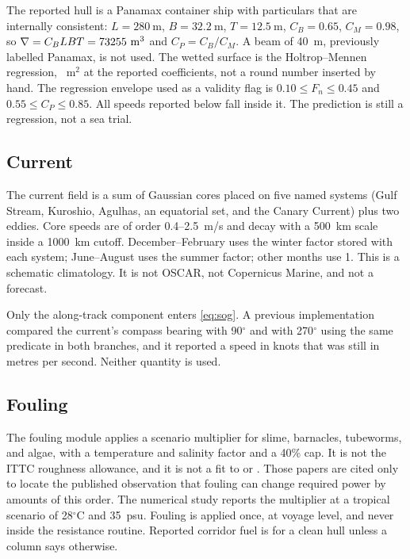 \documentclass[11pt]{article}
\begin{document}
The reported hull is a Panamax container ship with particulars that are internally consistent: \(L=280~\mathrm{m}\), \(B=32.2~\mathrm{m}\), \(T=12.5~\mathrm{m}\), \(C_B=0.65\), \(C_M=0.98\), so \(\nabla=C_B L B T=73255~\mathrm{m}^3\) and \(C_P=C_B/C_M\).
A beam of 40~m, previously labelled Panamax, is not used.
The wetted surface is the Holtrop--Mennen regression, \WettedSurface~m\(^2\) at the reported coefficients, not a round number inserted by hand.
The regression envelope used as a validity flag is \(0.10\le F_n\le 0.45\) and \(0.55\le C_P\le 0.85\).
All speeds reported below fall inside it.
The prediction is still a regression, not a sea trial.

\subsection{Current}
The current field is a sum of Gaussian cores placed on five named systems (Gulf Stream, Kuroshio, Agulhas, an equatorial set, and the Canary Current) plus two eddies.
Core speeds are of order 0.4--2.5~m/s and decay with a 500~km scale inside a 1000~km cutoff.
December--February uses the winter factor stored with each system; June--August uses the summer factor; other months use 1.
This is a schematic climatology.
It is not OSCAR, not Copernicus Marine, and not a forecast.

Only the along-track component enters \eqref{eq:sog}.
A previous implementation compared the current's compass bearing with 90\(^\circ\) and with 270\(^\circ\) using the same predicate in both branches, and it reported a speed in knots that was still in metres per second.
Neither quantity is used.

\subsection{Fouling}
The fouling module applies a scenario multiplier for slime, barnacles, tubeworms, and algae, with a temperature and salinity factor and a 40\% cap.
It is not the ITTC roughness allowance, and it is not a fit to \citet{schultz2007} or \citet{townsin2003}.
Those papers are cited only to locate the published observation that fouling can change required power by amounts of this order.
The numerical study reports the multiplier at a tropical scenario of 28\(^\circ\)C and 35~psu.
Fouling is applied once, at voyage level, and never inside the resistance routine.
Reported corridor fuel is for a clean hull unless a column says otherwise.
\end{document}

